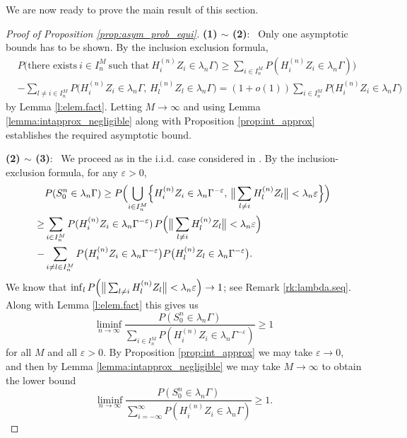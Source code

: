 \documentclass[11pt,reqno]{amsart}
\numberwithin{equation}{section}
\theoremstyle{definition}
\theoremstyle{remark}
\theoremstyle{definition}
\newcommand{\eps}{\varepsilon}
\begin{document}
We are now ready to prove the main result of this section. 
\begin{proof}[Proof of Proposition \ref{prop:asym_prob_equi}] {\bf (1) $\sim$ (2)}: \ 
Only one asymptotic bounds has to be shown. By the inclusion exclusion formula, 
\begin{align*}
    &P\bigl(\text{there exists} \  i \in I_n^M \ \text{such that} \  {H_i^{(n)}} Z_i \in \lambda_n \Gamma\bigr) \geq \sum_{i\in I_n^M} P({H_i^{(n)}} Z_i \in \lambda_n \Gamma)) \\
    & - \sum_{l\neq i \in I_n^M} P\bigl({H_i^{(n)}} Z_i \in \lambda_n
      \Gamma,\,  {H_{l}^{(n)}} Z_l \in \lambda_n \Gamma\bigr)
    = (1 + o(1)) \sum_{i\in I_n^M} P\bigl({H_i^{(n)}} Z_i \in \lambda_n \Gamma\bigr)
\end{align*}
by Lemma \ref{l:elem.fact}. Letting $M\to\infty$ and using Lemma
\ref{lemma:intapprox_negligible} along with Proposition
\ref{prop:int_approx} establishes the required asymptotic bound. 

{\bf (2) $\sim$ (3)}: \ We proceed as  in the i.i.d. case considered
in \cite{hult:lindskog:mikosch:samorodnitsky:2005}.  By the
inclusion-exclusion formula, for any $\eps >0$, 
\begin{align*}
   & P(S_0^n\in \lambda_n \Gamma) \geq  P\Bigl(\bigcup_{i\in I_n^M }
     \Bigl\{H_i^{(n)} Z_i \in \lambda_n \Gamma^{-\eps}, \, \big\|\sum_{l\neq i} H_l^{(n)} Z_l\big\| < \lambda_n \eps\Bigr\}\Bigr) \\
     \geq& \sum_{i\in I_n^M } P(H_i^{(n)} Z_i \in \lambda_n
           \Gamma^{-\eps}) \, P\Bigl(\big\|\sum_{l\neq i} H_l^{(n)} Z_l\big\| < \lambda_n \eps\Bigr)\\
     -&  \sum_{i\neq l \in I_n^M} P\bigl(H_i^{(n)} Z_i \in \lambda_n
        \Gamma^{-\eps}\bigr) P\bigl( H_l^{(n)} Z_l \in \lambda_n \Gamma^{-\eps}\bigr).
\end{align*}
We know that $\inf_l P\Bigl(\big\|\sum_{l\neq i} H_l^{(n)} Z_l\big\| <
\lambda_n \eps\Bigr)\to 1$; see Remark \ref{rk:lambda.seq}. Along with
Lemma \ref{l:elem.fact} this gives us
$$
\liminf_{n\to \infty} \frac{P(S_0^n\in \lambda_n \Gamma)}{\sum_{i\in I_n^M} P(H_i^{(n)} Z_i\in \lambda_n \Gamma^{-\eps})}  \geq 1
$$
for all $M$ and all $\eps>0$. By Proposition
\ref{prop:int_approx} we may take $\eps\to 0$, and then by Lemma
\ref{lemma:intapprox_negligible} we may take $M\to\infty$ to obtain
the lower bound 
$$
\liminf_{n\to \infty} \frac{P(S_0^n\in \lambda_n \Gamma)}{\sum_{i =
    -\infty}^\infty P(H_i^{(n)} Z_i\in \lambda_n \Gamma)}  \geq 1.
$$
 

\end{proof}
\end{document}
